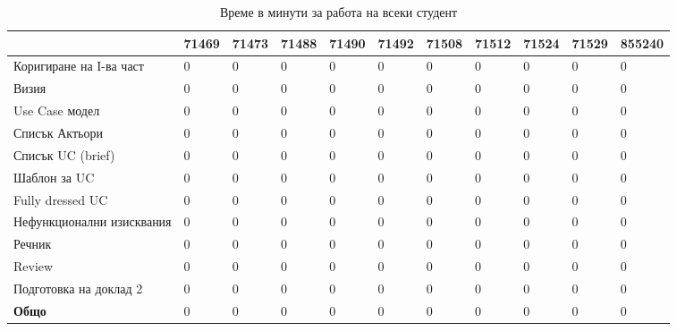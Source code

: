 \documentclass[]{article}
\begin{document}
\begin{table}[h]
\centering
\caption{Време в минути за работа на всеки студент}
\label{my-label}
\begin{tabular}{|l|l|l|l|l|l|l|l|l|l|l|}
\hline
                        	& 71469 & 71473 & 71488 & 71490 & 71492 & 71508 & 71512 & 71524 & 71529 & 855240 \\ \hline
Коригиране на I-ва част		& 0     & 0     & 0     & 0		& 0     & 0     & 0   	&  0    & 0     & 0      \\ \hline
Визия						& 0     & 0     & 0     & 0		& 0     & 0     & 0   	&  0    & 0     & 0      \\ \hline
Use Case модел				& 0     & 0     & 0     & 0		& 0     & 0     & 0   	&  0    & 0     & 0      \\ \hline
Списък Актьори				& 0     & 0     & 0     & 0		& 0     & 0     & 0   	&  0    & 0     & 0      \\ \hline
Списък UC (brief)			& 0     & 0     & 0     & 0		& 0     & 0     & 0   	&  0    & 0     & 0      \\ \hline
Шаблон за UC				& 0     & 0     & 0     & 0		& 0     & 0     & 0   	&  0    & 0     & 0      \\ \hline
Fully dressed UC			& 0     & 0     & 0     & 0		& 0     & 0     & 0   	&  0    & 0     & 0      \\ \hline
Нефункционални изисквания	& 0     & 0     & 0     & 0		& 0     & 0     & 0   	&  0    & 0     & 0      \\ \hline
Речник						& 0     & 0     & 0     & 0		& 0     & 0     & 0   	&  0    & 0     & 0      \\ \hline
Review						& 0     & 0     & 0     & 0		& 0     & 0     & 0   	&  0    & 0     & 0      \\ \hline
Подготовка на доклад 2  	& 0     & 0     & 0     & 0		& 0     & 0     & 0   	&  0    & 0     & 0      \\ \hline
\textbf{Общо}           	& 0     & 0     & 0     & 0		& 0     & 0     & 0   	&  0    & 0     & 0      \\ \hline
\end{tabular}
\end{table}
\end{document}
